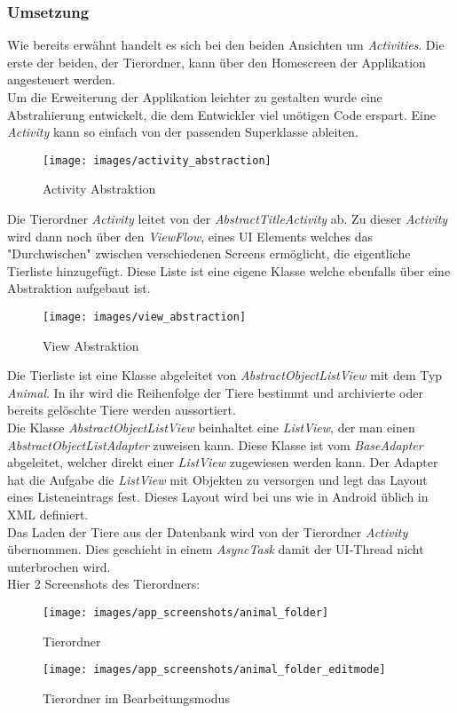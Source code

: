 \subsubsection{Umsetzung}
Wie bereits erwähnt handelt es sich bei den beiden Ansichten um \textit{Activities}. Die erste der beiden, der Tierordner, kann über den Homescreen der Applikation angesteuert werden. \\
Um die Erweiterung der Applikation leichter zu gestalten wurde eine Abstrahierung entwickelt, die dem Entwickler viel unötigen Code erspart. Eine \textit{Activity} kann so einfach von der passenden Superklasse ableiten. 
\begin{figure}[H]
\centering
\texttt{[image: images/activity\_abstraction]}
\caption{Activity Abstraktion}
\end{figure}
Die Tierordner \textit{Activity} leitet von der \textit{AbstractTitleActivity} ab. Zu dieser \textit{Activity} wird dann noch über den \textit{ViewFlow}, eines UI Elements welches das "Durchwischen" zwischen verschiedenen Screens ermöglicht, die eigentliche Tierliste hinzugefügt. Diese Liste ist eine eigene Klasse welche ebenfalls über eine Abstraktion aufgebaut ist. 
\begin{figure}[H]
\centering
\texttt{[image: images/view\_abstraction]}
\caption{View Abstraktion}
\end{figure}
Die Tierliste ist eine Klasse abgeleitet von \textit{AbstractObjectListView} mit dem Typ \textit{Animal}. In ihr wird die Reihenfolge der Tiere bestimmt und archivierte oder bereits gelöschte Tiere werden aussortiert.\\
Die Klasse \textit{AbstractObjectListView} beinhaltet eine \textit{ListView}, der man einen \textit{AbstractObjectListAdapter} zuweisen kann. Diese Klasse ist vom \textit{BaseAdapter} abgeleitet, welcher direkt einer \textit{ListView} zugewiesen werden kann. Der Adapter hat die Aufgabe die \textit{ListView} mit Objekten zu versorgen und legt das Layout eines Listeneintrags fest. Dieses Layout wird bei uns wie in Android üblich in XML definiert.\\[0.5em]
Das Laden der Tiere aus der Datenbank wird von der Tierordner \textit{Activity} übernommen. Dies geschieht in einem \textit{AsyncTask} damit der UI-Thread nicht unterbrochen wird.\\[0.5em]
Hier 2 Screenshots des Tierordners:
\begin{figure}[H]
  \centering
  \begin{minipage}[t]{7 cm}
  	\texttt{[image: images/app\_screenshots/animal\_folder]} 
    \caption{Tierordner}
  \end{minipage}
  \hspace{0.5cm}
  \begin{minipage}[t]{7 cm}
	\texttt{[image: images/app\_screenshots/animal\_folder\_editmode]}  
    \caption{Tierordner im Bearbeitungsmodus}
  \end{minipage}
\end{figure}
